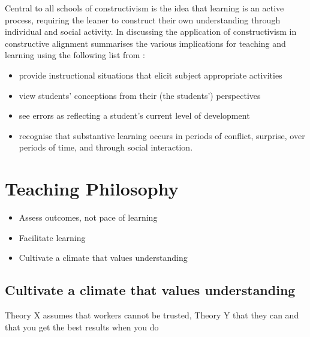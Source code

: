 Central to all schools of constructivism \cite{Duffy:1992,Steffe:1995} is the idea that learning is an active process, requiring the leaner to construct their own understanding through individual and social activity. In discussing the application of constructivism in constructive alignment \citet{Biggs:1996c} summarises the various implications for teaching and learning using the following list from \citet{Wood:1995}:
\begin{itemize}
	\item provide instructional situations that elicit subject appropriate activities
	\item view students' conceptions from their (the students') perspectives
	\item see errors as reflecting a student's current level of development
	\item recognise that substantive learning occurs in periods of conflict, surprise, over periods of time, and through social interaction.
\end{itemize}










\section{Teaching Philosophy} %
\label{sec:teaching_philosophy}

\begin{itemize}
	\item Assess outcomes, not pace of learning
	\item Facilitate learning 
	\item Cultivate a climate that values understanding
\end{itemize}


\subsection{Cultivate a climate that values understanding} %
\label{sub:cultivate_a_climate_that_values_understanding}

\citet{McGregor:1960}

Theory X assumes that workers cannot be trusted, Theory Y that they can and that you get the best results when you do

